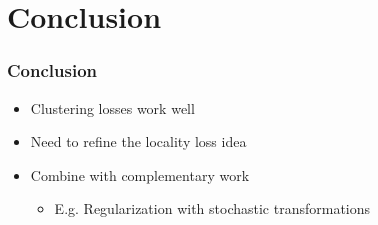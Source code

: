 \section{Conclusion}
\begin{frame}
	\frametitle{Conclusion}
	\begin{itemize}
		\item Clustering losses work well
		\item Need to refine the locality loss idea
		\item Combine with complementary work 
			\begin{itemize}
				\item E.g. Regularization with stochastic transformations
			\end{itemize}
	\end{itemize}
\end{frame}

